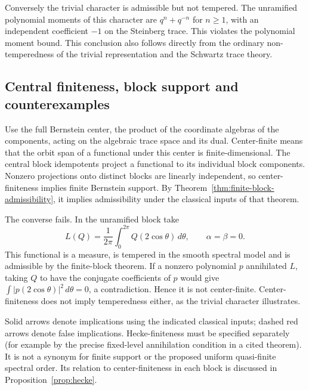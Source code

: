Conversely the trivial character is admissible but not tempered. The unramified polynomial moments of this character are $q^n+q^{-n}$ for $n\ge1$, with an independent coefficient $-1$ on the Steinberg trace. This violates the polynomial moment bound. This conclusion also follows directly from the ordinary non-temperedness of the trivial representation and the Schwartz trace theory.

\subsection{Central finiteness, block support and counterexamples}
Use the full Bernstein center, the product of the coordinate algebras of the components, acting on the algebraic trace space and its dual. Center-finite means that the orbit span of a functional under this center is finite-dimensional. The central block idempotents project a functional to its individual block components. Nonzero projections onto distinct blocks are linearly independent, so center-finiteness implies finite Bernstein support. By Theorem~\ref{thm:finite-block-admissibility}, it implies admissibility under the classical inputs of that theorem.

The converse fails. In the unramified block take
\[
L(Q)=\frac1{2\pi}\int_0^{2\pi}Q(2\cos\theta)\,d\theta,\qquad \alpha=\beta=0.
\]
This functional is a measure, is tempered in the smooth spectral model and is admissible by the finite-block theorem. If a nonzero polynomial $p$ annihilated $L$, taking $Q$ to have the conjugate coefficients of $p$ would give $\int |p(2\cos\theta)|^2\,d\theta=0$, a contradiction. Hence it is not center-finite. Center-finiteness does not imply temperedness either, as the trivial character illustrates.

\begin{center}
\end{center}
Solid arrows denote implications using the indicated classical inputs; dashed red arrows denote false implications. Hecke-finiteness must be specified separately (for example by the precise fixed-level annihilation condition in a cited theorem). It is not a synonym for finite support or the proposed uniform quasi-finite spectral order. Its relation to center-finiteness in each block is discussed in Proposition~\ref{prop:hecke}.

